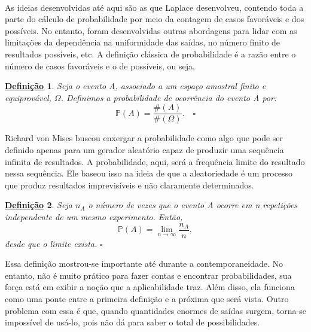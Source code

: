 \documentclass{article}
\newtheorem*{def*}{\underline{Defini\c c\~ao}}
\begin{document}
\paragraph{}As ideias desenvolvidas até aqui são as que Laplace desenvolveu, contendo toda a parte do cálculo
de probabilidade por meio da contagem de casos favoráveis e dos possíveis. No entanto, foram desenvolvidas outras
abordagens para lidar com as limitações da dependência na uniformidade das saídas, no número finito de resultados possíveis, etc.
A definição clássica de probabilidade é a razão entre o número de casos favoráveis e o de possíveis, ou seja, 
\begin{def*}
  Seja o evento A, associado a um espaço amostral finito e equiprovável, \(\Omega \). Definimos a probabilidade de ocorrência do evento A por: 
    \[
      \mathbb{P}(A) = \frac{\#(A)}{\#(\Omega )}.\quad \square
    \]
\end{def*}
  Richard von Mises buscou enxergar a probabilidade como algo que pode ser definido apenas para um gerador aleatório capaz de produzir uma sequência infinita de resultados.
A probabilidade, aqui, será a frequência limite do resultado nessa sequência. Ele baseou isso na ideia de que a aleatoriedade é um processo que produz resultados imprevisíveis
e não claramente determinados.
\begin{def*}
  Seja \(n_{A}\) o número de vezes que o evento A ocorre em n repetições independente de um mesmo experimento. Então, 
    \[
      \mathbb{P}(A) = \lim_{n\to \infty}\frac{n_{A}}{n},
    \]
    desde que o limite exista. \(\square\)
\end{def*}
 Essa definição mostrou-se importante até durante a contemporaneidade. No entanto, não é muito prático para fazer contas e encontrar probabilidades, 
sua força está em exibir a noção que a aplicabilidade traz. Além disso, ela funciona como uma ponte entre a primeira definição e a próxima que será vista.
Outro problema com essa é que, quando quantidades enormes de saídas surgem, torna-se impossível de usá-lo, pois não dá para saber o total de possibilidades.
  
\end{document}
